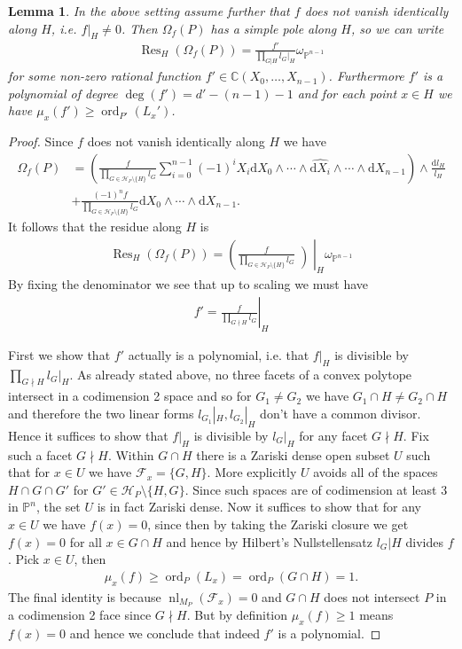 \documentclass[a4paper,10pt]{amsart}
\theoremstyle{definition}
\theoremstyle{plain}
\newtheorem{lem}[defin]{Lemma}
\newcommand{\Res}{\operatorname{Res}}
\newcommand{\ord}{\operatorname{ord}}
\newcommand{\nl}{\operatorname{nl}}
\newcommand{\dd}{\text{d}}
\newcommand{\cF}{{\mathcal F}}
\newcommand{\cH}{{\mathcal H}}
\newcommand{\C}{{\mathbb C}}
\newcommand{\pp}{\mathbb{P}}
\begin{document}
\begin{lem}
\label{crucial_Lemma}
    In the above setting  assume further that $f$ does not vanish identically along $H$, i.e. $f|_H\neq 0$. Then $\Omega_f(P)$ has a simple pole along $H$, so we can write \begin{align*}
        \Res_H(\Omega_f(P))= \frac{f'}{\prod_{G|H}l_G|_H} \omega_{\pp^{n-1}}
    \end{align*}
    for some non-zero rational function $f'\in \C(X_0,\ldots,X_{n-1})$. Furthermore $f'$ is a polynomial of degree $\deg(f')=d'-(n-1)-1$ and for each point $x \in H$ we have $\mu_x(f')\geq \ord_{P'}(L_x')$.
\end{lem}
\begin{proof}
    Since $f$ does not vanish identically along $H$ we have \begin{align*}
        \Omega_f(P)&=\left(\frac{f}{\prod_{G\in \cH_P\setminus \{H\}}l_G}\sum_{i=0}^{n-1} (-1)^iX_i\dd X_0\wedge \cdots \wedge \widehat{\dd X_i}\wedge \cdots \wedge \dd X_{n-1}\right)\wedge \frac{\dd l_H}{l_H} \\
        &+\frac{(-1)^nf}{\prod_{G\in\cH_P\setminus \{H\}}l_G}\dd X_0\wedge \cdots \wedge \dd X_{n-1}.
    \end{align*}
    It follows that the residue along $H$ is \begin{align*}
        \Res_H(\Omega_f(P))=\left(\frac{f}{\prod_{G\in \cH_P\setminus \{H\}}l_G}\middle)\right|_{H}\omega_{\pp^{n-1}}
    \end{align*}
    By fixing the denominator we see that up to scaling we must have \begin{align}
    \label{exprseeionforf'}
        f'= \left.\frac{f}{\prod_{G\nmid H}l_G}\right|_H
    \end{align}
    
    First we show that $f'$ actually is a polynomial, i.e. that $f|_H$ is divisible by $\prod_{G\nmid H}l_G|_H$. As already stated above, no three facets of a convex polytope intersect in a codimension 2 space and so for $G_1\neq G_2$ we have $G_1\cap H\neq G_2 \cap H$ and therefore the two linear forms $l_{G_1}|_H,l_{G_2}|_H$ don't have a common divisor. Hence it suffices to show that $f|_H$ is divisible by $l_G|_H$ for any facet $G\nmid H$. Fix such a facet $G\nmid H$. Within $G\cap H$ there is a Zariski dense open subset $U$ such that for $x\in U$ we have $\cF_x=\{G,H\}$. More explicitly $U$ avoids all of the spaces $H\cap G \cap G'$ for $G'\in \cH_P\setminus \{H,G\}$. Since such spaces are of codimension at least 3 in $\pp^n$, the set $U$ is in fact Zariski dense. Now it suffices to show that for any $x \in U$ we have $f(x)=0$, since then by taking the Zariski closure we get $f(x)=0$ for all $x \in G\cap H$ and hence by Hilbert's Nullstellensatz $l_G|H$ divides $f$. Pick $x\in U$, then \begin{align*}
        \mu_x(f)\geq \ord_P(L_x)=\ord_P(G\cap H)=1.
    \end{align*}
    The final identity is because $\nl_{M_P}(\cF_x)=0$ and $G\cap H$ does not intersect $P$ in a codimension 2 face since $G\nmid H$. But by definition $\mu_x(f)\geq 1$ means $f(x)=0$ and hence we conclude that indeed $f'$ is a polynomial.


\end{proof}
\end{document}
